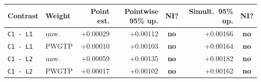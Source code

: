 \begin{tabular}{@{}llrrcrc@{}}
\toprule
Contrast & Weight & Point est. & Pointwise 95\% up. & NI? & Simult.\ 95\% up. & NI? \\
\midrule
\texttt{C1 - L1} & unw. & +0.00029 & +0.00112 & \textbf{no} & +0.00166 & \textbf{no} \\
\texttt{C1 - L1} & PWGTP & +0.00010 & +0.00103 & \textbf{no} & +0.00164 & \textbf{no} \\
\texttt{C1 - L2} & unw. & +0.00059 & +0.00135 & \textbf{no} & +0.00182 & \textbf{no} \\
\texttt{C1 - L2} & PWGTP & +0.00017 & +0.00102 & \textbf{no} & +0.00162 & \textbf{no} \\
\bottomrule
\end{tabular}

